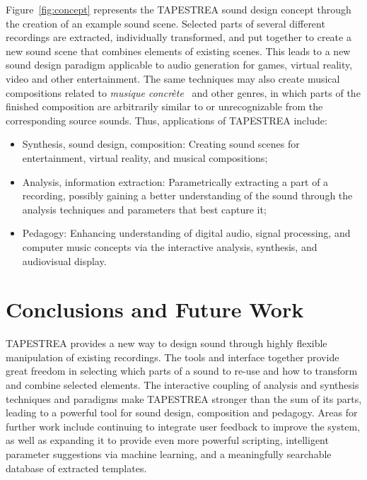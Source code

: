 \documentclass{sig-alt-release2}
\begin{document}
Figure~\ref{fig:concept} represents the TAPESTREA sound design concept through the creation of an example sound scene. Selected parts of several different recordings are extracted, individually transformed, and put together to create a new sound scene that combines elements of existing scenes. This leads to a new sound design paradigm applicable to audio generation for games, virtual reality, video and other entertainment. 
The same techniques may also create musical compositions related to \textit{musique concr\`ete}~\cite{Schaeffer52} and other genres, in which parts of the finished composition are arbitrarily similar to or unrecognizable from the corresponding source sounds. 
Thus, applications of TAPESTREA include: 

\begin{itemize}
\setlength\itemsep{-2pt} %
\item Synthesis, sound design, composition: Creating sound scenes for entertainment, virtual reality, and musical compositions;
\item Analysis, information extraction: Parametrically extracting a part of a recording, possibly gaining a better understanding of the sound through the analysis techniques and parameters that best capture it;
\item Pedagogy: Enhancing understanding of digital audio, signal processing, and computer music concepts via the interactive analysis, synthesis, and audiovisual display.
\end{itemize}

\section{Conclusions and Future Work}

TAPESTREA provides a new way to design sound through highly flexible manipulation of existing recordings. The tools and interface together provide great freedom in selecting which parts of a sound to re-use and how to transform and combine selected elements. The interactive coupling of analysis and synthesis techniques and paradigms make TAPESTREA stronger than the sum of its parts, leading to 
a powerful tool for sound design, composition and pedagogy. 
Areas for further work include continuing to integrate user feedback to improve the system, as well as expanding it to provide even more powerful scripting, intelligent parameter suggestions via machine learning, and a meaningfully searchable database of extracted templates. 
\end{document}
